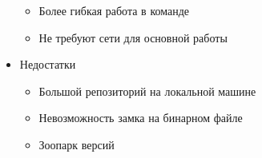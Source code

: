 \begin{frame}
\begin{columns}
\begin{itemize}
\begin{itemize}
       \item Более гибкая работа в команде
       \item Не требуют сети для основной работы
     \end{itemize}
    \item Недостатки
     \begin{itemize}
       \item Большой репозиторий на локальной машине
       \item Невозможность замка на бинарном файле
       \item Зоопарк версий
     \end{itemize}
   \end{itemize}
 \end{columns}
\end{frame}
